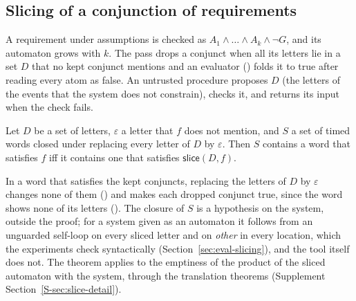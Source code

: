 \subsection{Slicing of a conjunction of requirements}
\label{sec:slicing}
A requirement under assumptions is checked as $A_1\wedge\dots\wedge A_k\wedge\neg G$, and its automaton grows with $k$. The pass  drops a conjunct when all its letters lie in a set $D$ that no kept conjunct mentions and an evaluator () folds it to true after reading every atom as false. An untrusted procedure proposes $D$ (the letters of the events that the system does not constrain),  checks it, and  returns its input when the check fails.

\begin{theorem}\label{thm:slice}
Let $D$ be a set of letters, $\varepsilon$ a letter that $f$ does not mention, and $S$ a set of timed words closed under replacing every letter of $D$ by $\varepsilon$. Then $S$ contains a word that satisfies $f$ iff it contains one that satisfies $\mathsf{slice}(D,f)$.
\end{theorem}
\noindent In a word that satisfies the kept conjuncts, replacing the letters of $D$ by $\varepsilon$ changes none of them () and makes each dropped conjunct true, since the word shows none of its letters (). The closure of $S$ is a hypothesis on the system, outside the proof; for a system given as an automaton it follows from an unguarded self-loop on every sliced letter and on \emph{other} in every location, which the experiments check syntactically (Section~\ref{sec:eval-slicing}), and the tool itself does not. The theorem applies to the emptiness of the product of the sliced automaton with the system, through the translation theorems (Supplement Section~\ref{S-sec:slice-detail}).

